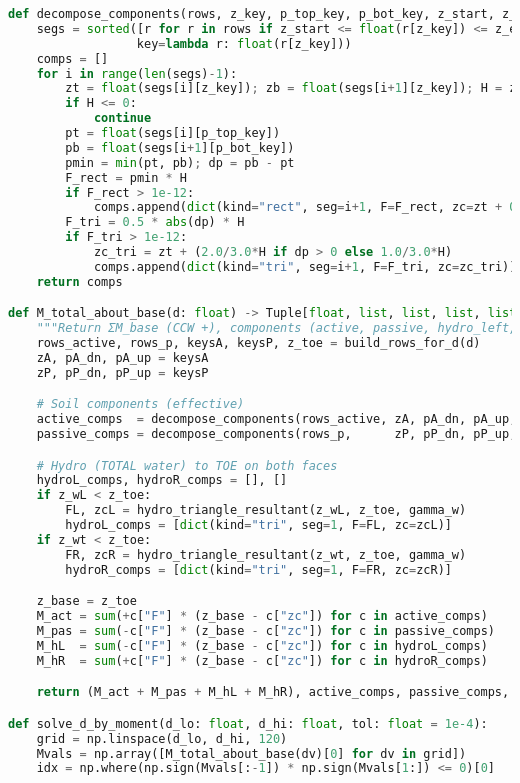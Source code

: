 \begin{lstlisting}[language=Python]
def decompose_components(rows, z_key, p_top_key, p_bot_key, z_start, z_end):
    segs = sorted([r for r in rows if z_start <= float(r[z_key]) <= z_end],
                  key=lambda r: float(r[z_key]))
    comps = []
    for i in range(len(segs)-1):
        zt = float(segs[i][z_key]); zb = float(segs[i+1][z_key]); H = zb - zt
        if H <= 0: 
            continue
        pt = float(segs[i][p_top_key])
        pb = float(segs[i+1][p_bot_key])
        pmin = min(pt, pb); dp = pb - pt
        F_rect = pmin * H
        if F_rect > 1e-12:
            comps.append(dict(kind="rect", seg=i+1, F=F_rect, zc=zt + 0.5*H))
        F_tri = 0.5 * abs(dp) * H
        if F_tri > 1e-12:
            zc_tri = zt + (2.0/3.0*H if dp > 0 else 1.0/3.0*H)
            comps.append(dict(kind="tri", seg=i+1, F=F_tri, zc=zc_tri))
    return comps

def M_total_about_base(d: float) -> Tuple[float, list, list, list, list, float]:
    """Return ΣM_base (CCW +), components (active, passive, hydro_left, hydro_right), and z_toe."""
    rows_active, rows_p, keysA, keysP, z_toe = build_rows_for_d(d)
    zA, pA_dn, pA_up = keysA
    zP, pP_dn, pP_up = keysP

    # Soil components (effective)
    active_comps  = decompose_components(rows_active, zA, pA_dn, pA_up, 0.0, z_toe)  # right → CCW(+)
    passive_comps = decompose_components(rows_p,      zP, pP_dn, pP_up, Z,  z_toe)   # left  → CW(-)

    # Hydro (TOTAL water) to TOE on both faces
    hydroL_comps, hydroR_comps = [], []
    if z_wL < z_toe:
        FL, zcL = hydro_triangle_resultant(z_wL, z_toe, gamma_w)
        hydroL_comps = [dict(kind="tri", seg=1, F=FL, zc=zcL)]          # left → CW(-)
    if z_wt < z_toe:
        FR, zcR = hydro_triangle_resultant(z_wt, z_toe, gamma_w)
        hydroR_comps = [dict(kind="tri", seg=1, F=FR, zc=zcR)]          # right → CCW(+)

    z_base = z_toe
    M_act = sum(+c["F"] * (z_base - c["zc"]) for c in active_comps)     # CCW(+)
    M_pas = sum(-c["F"] * (z_base - c["zc"]) for c in passive_comps)    # CW(-)
    M_hL  = sum(-c["F"] * (z_base - c["zc"]) for c in hydroL_comps)     # CW(-)
    M_hR  = sum(+c["F"] * (z_base - c["zc"]) for c in hydroR_comps)     # CCW(+)

    return (M_act + M_pas + M_hL + M_hR), active_comps, passive_comps, hydroL_comps, hydroR_comps, z_toe

def solve_d_by_moment(d_lo: float, d_hi: float, tol: float = 1e-4):
    grid = np.linspace(d_lo, d_hi, 120)
    Mvals = np.array([M_total_about_base(dv)[0] for dv in grid])
    idx = np.where(np.sign(Mvals[:-1]) * np.sign(Mvals[1:]) <= 0)[0]


\end{lstlisting}
